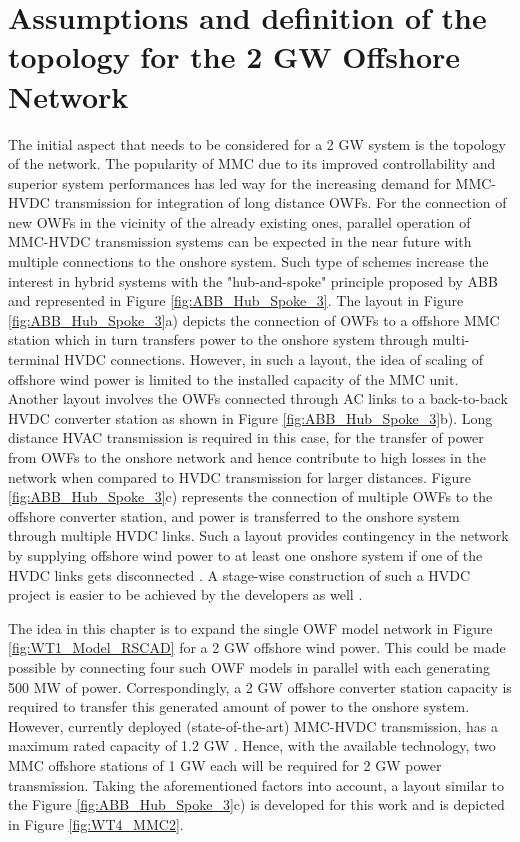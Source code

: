 \section{Assumptions and definition of the topology for the 2 GW Offshore Network}
The initial aspect that needs to be considered for a 2 GW system is the topology of the network. The popularity of \gls{MMC} due to its improved controllability and superior system performances has led way for the increasing demand for \gls{MMC}-\gls{HVDC} transmission for integration of long distance \gls{OWF}s. For the connection of new \gls{OWF}s in the vicinity of the already existing ones, parallel operation of \gls{MMC}-\gls{HVDC} transmission systems can be expected in the near future with multiple connections to the onshore system. Such type of schemes increase the interest in hybrid systems with the "hub-and-spoke" principle proposed by ABB \cite{abb_hvdc_2018} and represented in Figure \ref{fig:ABB_Hub_Spoke_3}. The layout in Figure \ref{fig:ABB_Hub_Spoke_3}a) depicts the connection of \gls{OWF}s to a offshore \gls{MMC} station which in turn transfers power to the onshore system through multi-terminal \gls{HVDC} connections. However, in such a layout, the idea of scaling of offshore wind power is limited to the installed capacity of the \gls{MMC} unit. Another layout involves the \gls{OWF}s connected through \gls{AC} links to a back-to-back \gls{HVDC} converter station as shown in Figure \ref{fig:ABB_Hub_Spoke_3}b). Long distance \gls{HVAC} transmission is required in this case, for the transfer of power from \gls{OWF}s to the onshore network and hence contribute to high losses in the network when compared to \gls{HVDC} transmission for larger distances. Figure \ref{fig:ABB_Hub_Spoke_3}c) represents the connection of multiple \gls{OWF}s to the offshore converter station, and power is transferred to the onshore system through multiple \gls{HVDC} links. Such a layout provides contingency in the network by supplying offshore wind power to at least one onshore system if one of the \gls{HVDC} links gets disconnected \cite{lescale2012parallelling}. A stage-wise construction of such a \gls{HVDC} project is easier to be achieved by the developers as well \cite{irnawan2019planning}.

The idea in this chapter is to expand the single \gls{OWF} model network in Figure \ref{fig:WT1_Model_RSCAD} for a 2 GW offshore wind power. This could be made possible by connecting four such \gls{OWF} models in parallel with each generating 500 MW of power. Correspondingly, a 2 GW offshore converter station capacity is required to transfer this generated amount of power to the onshore system. However, currently deployed (state-of-the-art) \gls{MMC}-\gls{HVDC} transmission, has a maximum rated capacity of 1.2 GW \cite{cigre2005b4}. Hence, with the available technology, two \gls{MMC} offshore stations of 1 GW each will be required for 2 GW power transmission. Taking the aforementioned factors into account, a layout similar to the Figure \ref{fig:ABB_Hub_Spoke_3}c) is developed for this work and is depicted in Figure \ref{fig:WT4_MMC2}. 

